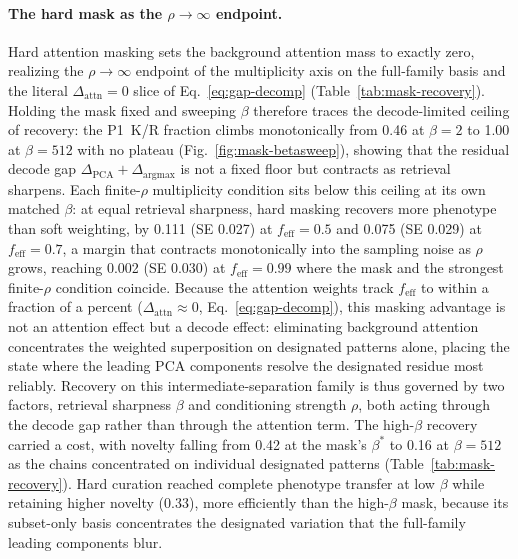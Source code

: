 \paragraph{The hard mask as the $\rho \to \infty$ endpoint.}
Hard attention masking sets the background attention mass to exactly zero, realizing the
$\rho \to \infty$ endpoint of the multiplicity axis on the full-family basis and the literal
$\Delta_{\mathrm{attn}} = 0$ slice of Eq.~\ref{eq:gap-decomp} (Table~\ref{tab:mask-recovery}).
Holding the mask fixed and sweeping $\beta$ therefore traces the decode-limited ceiling of
recovery: the P1~K/R fraction climbs monotonically from 0.46 at $\beta = 2$ to 1.00 at
$\beta = 512$ with no plateau (Fig.~\ref{fig:mask-betasweep}), showing that the residual decode gap
$\Delta_{\mathrm{PCA}} + \Delta_{\mathrm{argmax}}$ is not a fixed floor but contracts as retrieval
sharpens. Each finite-$\rho$ multiplicity condition sits below this ceiling at its own matched
$\beta$: at equal retrieval sharpness, hard masking recovers more phenotype than soft weighting,
by 0.111 (SE 0.027) at $f_{\mathrm{eff}} = 0.5$ and 0.075 (SE 0.029) at $f_{\mathrm{eff}} = 0.7$, a
margin that contracts monotonically into the sampling noise as $\rho$ grows, reaching 0.002
(SE 0.030) at $f_{\mathrm{eff}} = 0.99$ where the mask and the strongest finite-$\rho$ condition
coincide. Because the attention weights track $f_{\mathrm{eff}}$ to within a fraction of a percent
($\Delta_{\mathrm{attn}} \approx 0$, Eq.~\ref{eq:gap-decomp}), this masking advantage is not an
attention effect but a decode effect: eliminating background attention concentrates the weighted
superposition on designated patterns alone, placing the state where the leading PCA components
resolve the designated residue most reliably. Recovery on this intermediate-separation family is
thus governed by two factors, retrieval sharpness $\beta$ and conditioning strength $\rho$, both
acting through the decode gap rather than through the attention term. The high-$\beta$ recovery carried a cost, with novelty
falling from 0.42 at the mask's $\beta^{*}$ to 0.16 at $\beta = 512$ as the chains concentrated on
individual designated patterns (Table~\ref{tab:mask-recovery}). Hard curation reached complete
phenotype transfer at low $\beta$ while retaining higher novelty (0.33), more efficiently than the
high-$\beta$ mask, because its subset-only basis concentrates the designated variation that the
full-family leading components blur.

